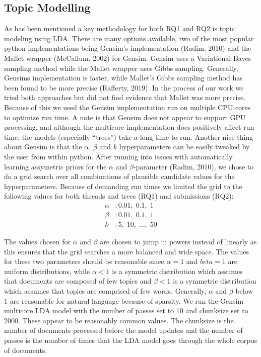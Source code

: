 \documentclass{article}
\begin{document}
    \subsection{Topic Modelling}
    As has been mentioned a key methodology for both RQ1 and RQ2 is topic modeling using LDA. There are many options available, two of the most popular python implementations being Gensim’s implementation (Radim, 2010) and the Mallet wrapper (McCallum, 2002) for Gensim. Gensim uses a Variational Bayes sampling method while the Mallet wrapper uses Gibbs sampling. Generally, Gensims implementation is faster, while Mallet’s Gibbs sampling method has been found to be more precise (Rafferty, 2019). In the process of our work we tried both approaches but did not find evidence that Mallet was more precise. Because of this we used the Gensim implementation run on multiple CPU cores to optimize run time. A note is that Gensim does not appear to support GPU processing, and although the multicore implementation does positively affect run time, the models (especially “trees”) take a long time to run. 
Another nice thing about Gensim is that the $\alpha$, $\beta$ and $k$ hyperparameters can be easily tweaked by the user from within python. After running into issues with automatically learning assymetric priors for the $\alpha$ and $\beta$-parameter (Radim, 2010), we chose to do a grid search over all combinations of plausible candidate values for the hyperparameters. Because of demanding run times we limited the grid to the following values for both threads and trees (RQ1) and submissions (RQ2): 
\begin{align*} 
    \alpha&: 0.01,\; 0.1,\; 1\\
    \beta&: 0.01, \; 0.1, \; 1 \\
    k&: 5, \; 10, \; \ldots,\; 50     
\end{align*}

The values chosen for $\alpha$ and $\beta$ are chosen to jump in powers instead of linearly as this ensures that the grid searches a more balanced and wide space. The values for these two parameters should be reasonable since $\alpha = 1$ and $beta = 1$ are uniform distributions, while $\alpha < 1$ is a symmetric distribution which assumes that documents are composed of few topics and $\beta < 1$ is a symmetric distribution which assumes that topics are comprised of few words. Generally, $\alpha$ and $\beta$ below 1 are reasonable for natural language because of sparsity. 
We run the Gensim multicore LDA model with the number of passes set to 10 and chunksize set to 2000. These appear to be reasonably common values. The chunksize is the number of documents processed before the model updates and the number of passes is the number of times that the LDA model goes through the whole corpus of documents.
\end{document}
